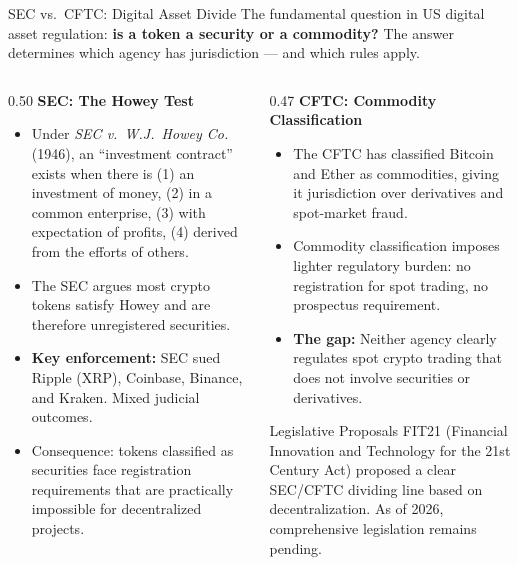 \begin{frame}{SEC vs.\ CFTC: Digital Asset Divide}
  The fundamental question in US digital asset regulation: \textbf{is a token
  a security or a commodity?} The answer determines which agency has
  jurisdiction --- and which rules apply.

  \vspace{0.5em}
  \begin{columns}[T]
    \begin{column}{0.50\textwidth}
      \textcolor{mlpurple}{\textbf{SEC: The Howey Test}}
      \begin{itemize}
        \item Under \textit{SEC v.\ W.J.\ Howey Co.} (1946), an ``investment
              contract'' exists when there is (1) an investment of money,
              (2) in a common enterprise, (3) with expectation of profits,
              (4) derived from the efforts of others.
        \item The SEC argues most crypto tokens satisfy Howey and are therefore
              unregistered securities.
        \item \textbf{Key enforcement:} SEC sued Ripple (XRP), Coinbase,
              Binance, and Kraken. Mixed judicial outcomes.
        \item Consequence: tokens classified as securities face registration
              requirements that are practically impossible for decentralized
              projects.
      \end{itemize}
    \end{column}
    \begin{column}{0.47\textwidth}
      \textcolor{mlpurple}{\textbf{CFTC: Commodity Classification}}
      \begin{itemize}
        \item The CFTC has classified Bitcoin and Ether as commodities,
              giving it jurisdiction over derivatives and spot-market fraud.
        \item Commodity classification imposes lighter regulatory burden:
              no registration for spot trading, no prospectus requirement.
        \item \textbf{The gap:} Neither agency clearly regulates spot crypto
              trading that does not involve securities or derivatives.
      \end{itemize}

      \vspace{0.3em}
      \begin{block}{Legislative Proposals}
        FIT21 (Financial Innovation and Technology for the 21st Century Act)
        proposed a clear SEC/CFTC dividing line based on decentralization.
        \textcolor{mlpurple}{As of 2026, comprehensive legislation remains
        pending.}
      \end{block}
    \end{column}
  \end{columns}
\end{frame}

